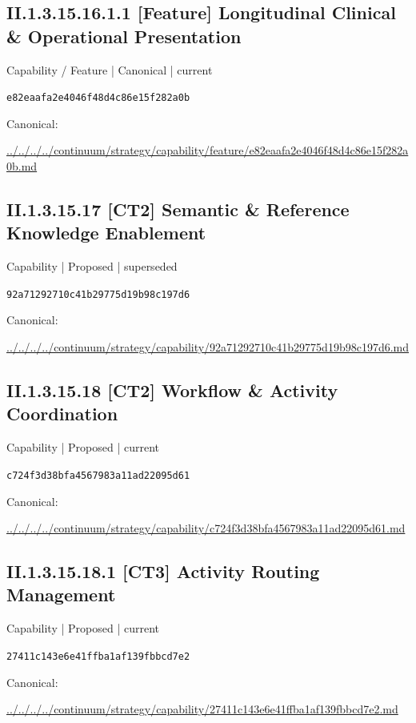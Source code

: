 \documentclass[10pt,a4paper]{article}
\begin{document}
\subsection*{II.1.3.15.16.1.1 [Feature] Longitudinal Clinical \& Operational Presentation}
{\small Capability / Feature | Canonical | current}\par
\texttt{e82eaafa2e4046f48d4c86e15f282a0b}\par
Canonical: \par
{\footnotesize\url{../../../../continuum/strategy/capability/feature/e82eaafa2e4046f48d4c86e15f282a0b.md}}\par
\subsection*{II.1.3.15.17 [CT2] Semantic \& Reference Knowledge Enablement}
{\small Capability | Proposed | superseded}\par
\texttt{92a71292710c41b29775d19b98c197d6}\par
Canonical: \par
{\footnotesize\url{../../../../continuum/strategy/capability/92a71292710c41b29775d19b98c197d6.md}}\par
\subsection*{II.1.3.15.18 [CT2] Workflow \& Activity Coordination}
{\small Capability | Proposed | current}\par
\texttt{c724f3d38bfa4567983a11ad22095d61}\par
Canonical: \par
{\footnotesize\url{../../../../continuum/strategy/capability/c724f3d38bfa4567983a11ad22095d61.md}}\par
\subsection*{II.1.3.15.18.1 [CT3] Activity Routing Management}
{\small Capability | Proposed | current}\par
\texttt{27411c143e6e41ffba1af139fbbcd7e2}\par
Canonical: \par
{\footnotesize\url{../../../../continuum/strategy/capability/27411c143e6e41ffba1af139fbbcd7e2.md}}\par
\end{document}
